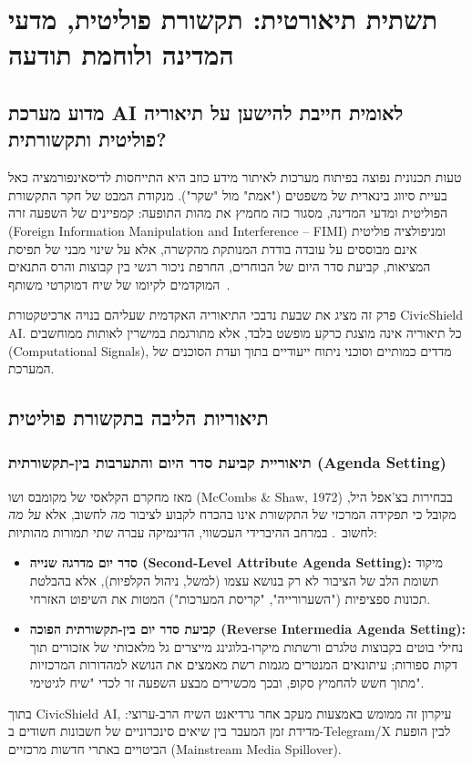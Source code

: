 \chapter{תשתית תיאורטית: תקשורת פוליטית, מדעי המדינה ולוחמת תודעה}
\label{ch:theory}

\section{מדוע מערכת AI לאומית חייבת להישען על תיאוריה פוליטית ותקשורתית?}
טעות תכנונית נפוצה בפיתוח מערכות לאיתור מידע כוזב היא התייחסות לדיסאינפורמציה כאל בעיית סיווג בינארית של משפטים ("אמת" מול "שקר"). מנקודת המבט של חקר התקשורת הפוליטית ומדעי המדינה, מסגור כזה מחמיץ את מהות התופעה: קמפיינים של השפעה זרה (Foreign Information Manipulation and Interference -- FIMI) ומניפולציה פוליטית אינם מבוססים על עובדה בודדת המנותקת מהקשרה, אלא על שינוי מבני של תפיסת המציאות, קביעת סדר היום של הבוחרים, החרפת ניכור רגשי בין קבוצות והרס התנאים המוקדמים לקיומו של שיח דמוקרטי משותף~\cite{walker2018sharp,lazer2018fake}.

פרק זה מציג את שבעת נדבכי התיאוריה האקדמית שעליהם בנויה ארכיטקטורת CivicShield AI. כל תיאוריה אינה מוצגת כרקע מופשט בלבד, אלא מתורגמת במישרין לאותות ממוחשבים (Computational Signals), מדדים כמותיים וסוכני ניתוח ייעודיים בתוך ועדת הסוכנים של המערכת.

\section{תיאוריות הליבה בתקשורת פוליטית}

\subsection{תיאוריית קביעת סדר היום והתערבות בין-תקשורתית (Agenda Setting)}
מאז מחקרם הקלאסי של מקומבס ושו (McCombs \& Shaw, 1972) בבחירות בצ'אפל היל, מקובל כי תפקידה המרכזי של התקשורת אינו בהכרח לקבוע לציבור \emph{מה} לחשוב, אלא \emph{על מה} לחשוב~\cite{mccombs1972agenda}. במרחב ההיברידי העכשווי, הדינמיקה עברה שתי תמורות מהותיות:
\begin{itemize}
    \item \textbf{סדר יום מדרגה שנייה (Second-Level Attribute Agenda Setting):} מיקוד תשומת הלב של הציבור לא רק בנושא עצמו (למשל, ניהול הקלפיות), אלא בהבלטת תכונות ספציפיות ("השערורייה", "קריסת המערכות") המטות את השיפוט האזרחי.
    \item \textbf{קביעת סדר יום בין-תקשורתית הפוכה (Reverse Intermedia Agenda Setting):} נחילי בוטים בקבוצות טלגרם ורשתות מיקרו-בלוגינג מייצרים גל מלאכותי של אזכורים תוך דקות ספורות; עיתונאים המנטרים מגמות רשת מאמצים את הנושא למהדורות המרכזיות מתוך חשש להחמיץ סקופ, ובכך מכשירים מבצע השפעה זר לכדי "שיח לגיטימי".
\end{itemize}
בתוך CivicShield AI, עיקרון זה ממומש באמצעות מעקב אחר גרדיאנט השיח הרב-ערוצי: מדידת זמן המעבר בין שיאים סינכרוניים של חשבונות חשודים ב-Telegram/X לבין הופעת הביטויים באתרי חדשות מרכזיים (Mainstream Media Spillover).

